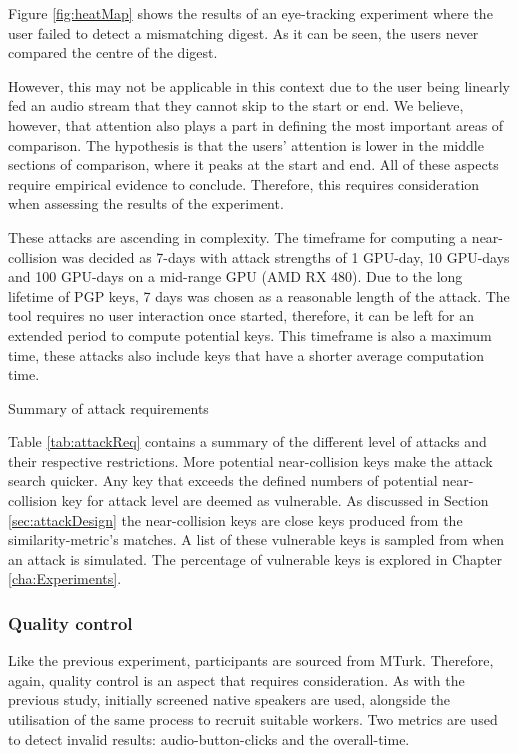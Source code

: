 Figure \ref{fig:heatMap} shows the results of an eye-tracking experiment where the user failed to detect a mismatching digest. As it can be seen, the users never compared the centre of the digest. 

However, this may not be applicable in this context due to the user being linearly fed an audio stream that they cannot skip to the start or end. We believe, however, that attention also plays a part in defining the most important areas of comparison. The hypothesis is that the users' attention is lower in the middle sections of comparison, where it peaks at the start and end. All of these aspects require empirical evidence to conclude. Therefore, this requires consideration when assessing the results of the experiment.

These attacks are ascending in complexity. The timeframe for computing a near-collision was decided as 7-days with attack strengths of 1 GPU-day, 10 GPU-days and 100 GPU-days on a mid-range GPU (AMD RX 480). Due to the long lifetime of PGP keys, 7 days was chosen as a reasonable length of the attack. The tool requires no user interaction once started, therefore, it can be left for an extended period to compute potential keys. This timeframe is also a maximum time, these attacks also include keys that have a shorter average computation time.

\begin{table}[h!]
    \centering
    
    \caption{Summary of attack requirements}
    \label{tab:attackReq}
\end{table}

Table \ref{tab:attackReq} contains a summary of the different level of attacks and their respective restrictions. More potential near-collision keys make the attack search quicker. Any key that exceeds the defined numbers of potential near-collision key for attack level are deemed as vulnerable.  As discussed in Section \ref{sec:attackDesign} the near-collision keys are close keys produced from the similarity-metric's matches. A list of these vulnerable keys is sampled from when an attack is simulated. The percentage of vulnerable keys is explored in Chapter \ref{cha:Experiments}.

\subsubsection{Quality control}
\label{sec:exp2_quality}
Like the previous experiment, participants are sourced from MTurk. Therefore, again, quality control is an aspect that requires consideration. As with the previous study, initially screened native speakers are used, alongside the utilisation of the same process to recruit suitable workers. Two metrics are used to detect invalid results: audio-button-clicks and the overall-time. 

